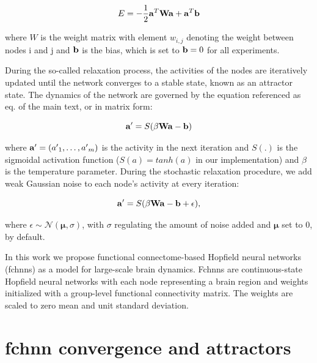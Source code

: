 \documentclass{article}
\begin{document}
\begin{equation}
\label{energy-function}
E = - \frac{1}{2}  \bold{a}^{T} \bold{W} \bold{a} + \bold{a}^{T}\bold{b}
\end{equation}

where $W$ is the weight matrix with element $w_{i,j}$ denoting the weight between nodes i and j and $\bold{b}$ is the bias, which is set to $\bold{b} = 0$ for all experiments.

During the so-called relaxation process, the activities of the nodes are iteratively updated until the network converges to a stable state, known as an attractor state. The dynamics of the network are governed by the equation referenced as eq. \href{\#hopfield-update}{} of the main text, or in matrix form:

\begin{equation}
\label{hopfield-update-matrix}
\bold{a'} = S(\beta \bold{W} \bold{a} - \bold{b})
\end{equation}

where $\bold{a'} = ({a'}_1, \dots, {a'}_m)$ is the activity in the next iteration and $S(.)$ is the sigmoidal activation function ($S(a) = tanh(a)$ in our implementation) and $\beta$ is the temperature parameter.
During the stochastic relaxation procedure, we add weak Gaussian noise to each node's activity at every iteration:

\begin{equation}
\label{hopfield-update-matrix-stochastic}
\bold{a'} = S(\beta \bold{W} \bold{a} - \bold{b}  + \epsilon),
\end{equation}

where $\epsilon \sim \mathcal{N}(\mathbf{\mu}, \sigma)$, with $\sigma$ regulating the amount of noise added and $\mathbf{\mu}$ set to 0, by default.

In this work we propose functional connectome-based Hopfield neural networks (\acrshort{fchnn}s) as a model for large-scale brain dynamics.
Fc\acrshort{hnn}s are continuous-state Hopfield neural networks with each node representing a brain region and weights initialized with a group-level functional connectivity matrix. The weights are scaled to zero mean and unit standard deviation.

\section{\acrshort{fchnn} convergence and attractors}
\end{document}
